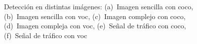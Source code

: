 \begin{figure}[H]
	\centering
	 \hspace{10pt}
	 \hspace{10pt}
	 \hspace{10pt}
	\caption{Detección en distintas imágenes: (a)~Imagen sencilla con \acrshort{coco}, (b)~Imagen sencilla con \acrshort{voc}, (c)~Imagen complejo con \acrshort{coco}, (d)~Imagen compleja con \acrshort{voc}, (e)~Señal de tráfico con \acrshort{coco}, (f)~Señal de tráfico con \acrshort{voc}}
	\label{fig.ssd1}
\end{figure}

